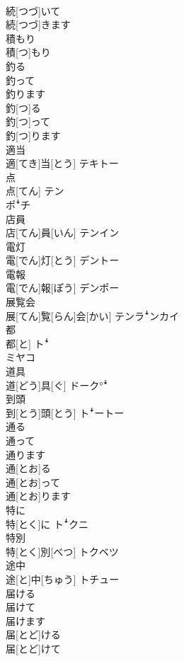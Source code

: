 \documentclass[8pt]{extreport}
\begin{document}
\begin{CJK}{UTF8}{min}
\\	続[つづ]いて 
\\	続[つづ]きます	
\\	積もり	
\\	積[つ]もり	
\\	釣る 
\\	釣って 
\\	釣ります	
\\	釣[つ]る 
\\	釣[つ]って 
\\	釣[つ]ります	
\\	適当	
\\	適[てき]当[とう]	テキトー
\\	点	
\\	点[てん]	テン 
\\	ポꜜチ
\\	店員	
\\	店[てん]員[いん]	テンイン
\\	電灯	
\\	電[でん]灯[とう]	デントー
\\	電報	
\\	電[でん]報[ぽう]	デンポー
\\	展覧会	
\\	展[てん]覧[らん]会[かい]	テンラꜜンカイ
\\	都	
\\	都[と]	トꜜ 
\\	ミヤコ
\\	道具	
\\	道[どう]具[ぐ]	ドーク°ꜜ
\\	到頭	
\\	到[とう]頭[とう]	トꜜートー
\\	通る 
\\	通って 
\\	通ります	
\\	通[とお]る 
\\	通[とお]って 
\\	通[とお]ります	
\\	特に	
\\	特[とく]に	トꜜクニ
\\	特別	
\\	特[とく]別[べつ]	トクベツ
\\	途中	
\\	途[と]中[ちゅう]	トチュー
\\	届ける 
\\	届けて 
\\	届けます	
\\	届[とど]ける 
\\	届[とど]けて 

\end{CJK}
\end{document}
